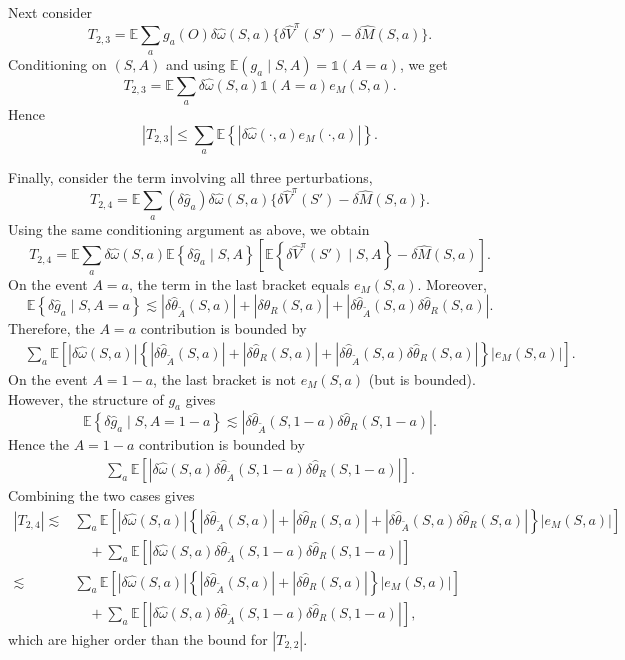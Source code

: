 \documentclass[12pt]{article}
\newcommand{\0}{\boldsymbol{0}}
\newcommand{\E}{\mathbb{E}}
\begin{document}
Next consider
\[
T_{2,3}=\E\sum_ag_a(O)\delta \widehat \omega(S,a)\{\delta \widehat V^\pi(S')-\delta \widehat M(S,a)\}.
\]
Conditioning on \((S,A)\) and using \(\E(g_a\mid S,A)=\mathds 1(A=a)\), we get
\[
T_{2,3}=\E\sum_a\delta \widehat \omega(S,a)\mathds 1(A=a) e_M(S,a).
\]
Hence
\[
|T_{2,3}|\le\sum_a\E\left\{|\delta \widehat \omega(\cdot,a) e_M(\cdot,a)|\right\}.
\]

Finally, consider the term involving all three perturbations,
\[
T_{2,4}=\E\sum_a(\delta \widehat g_a)\delta \widehat \omega(S,a)\{\delta \widehat V^\pi(S')-\delta \widehat M(S,a)\}.
\]
Using the same conditioning argument as above, we obtain
\[
T_{2,4}=\mathbb E\sum_a\delta\widehat\omega(S,a)
\mathbb E\!\left\{\delta\widehat g_a \mid S,A\right\}
\left[\mathbb E\!\left\{\delta \widehat V^\pi(S') \mid S,A\right\}-\delta \widehat M(S,a)
\right].
\]
On the event \(A=a\), the term in the last bracket equals \(e_M(S,a)\). Moreover,
\[
\mathbb E\!\left\{\delta\widehat g_a \mid S,A=a\right\}
\lesssim |\delta\widehat\theta_{\widetilde A}(S,a)|
+|\delta\widehat\theta_R(S,a)|
+|\delta\widehat\theta_{\widetilde A}(S,a)\delta\widehat\theta_R(S,a)|.
\]
Therefore, the \(A=a\) contribution is bounded by
\[
\begin{aligned}
&\sum_a\mathbb E\!\left[|\delta\widehat\omega(S,a)|
\left\{|\delta\widehat\theta_{\widetilde A}(S,a)|+|\delta\widehat\theta_R(S,a)|
+|\delta\widehat\theta_{\widetilde A}(S,a)\delta\widehat\theta_R(S,a)|\right\}|e_M(S,a)|\right].
\end{aligned}
\]
On the event \(A=1-a\), the last bracket is not \(e_M(S,a)\) (but is bounded). However,
the structure of \(g_a\) gives
\[
\mathbb E\!\left\{\delta\widehat g_a \mid S,A=1-a\right\}
\lesssim |\delta\widehat\theta_{\widetilde A}(S,1-a)\delta\widehat\theta_R(S,1-a)|.
\]
Hence the \(A=1-a\) contribution is bounded by
\[
\begin{aligned}
\sum_a\mathbb E\!\left[|\delta\widehat\omega(S,a)
\delta\widehat\theta_{\widetilde A}(S,1-a)\delta\widehat\theta_R(S,1-a)|
\right].
\end{aligned}
\]
Combining the two cases gives
\[
\begin{aligned}
|T_{2,4}|\lesssim
&\sum_a\mathbb E\!\left[
|\delta\widehat\omega(S,a)|
\left\{|\delta\widehat\theta_{\widetilde A}(S,a)|
+|\delta\widehat\theta_R(S,a)|
+|\delta\widehat\theta_{\widetilde A}(S,a)\delta\widehat\theta_R(S,a)|
\right\}|e_M(S,a)|
\right] \\
&\quad+\sum_a\mathbb E\!\left[
|\delta\widehat\omega(S,a)
\delta\widehat\theta_{\widetilde A}(S,1-a)\delta\widehat\theta_R(S,1-a)|
\right]\\
\lesssim
&\sum_a\mathbb E\!\left[
|\delta\widehat\omega(S,a)|\left\{|\delta\widehat\theta_{\widetilde A}(S,a)|
+|\delta\widehat\theta_R(S,a)|\right\}|e_M(S,a)|\right] \\
&\quad+\sum_a\mathbb E\!\left[|\delta\widehat\omega(S,a)
\delta\widehat\theta_{\widetilde A}(S,1-a)\delta\widehat\theta_R(S,1-a)|\right],
\end{aligned}
\]
which are higher order than the bound for $|T_{2,2}|$.
\end{document}
